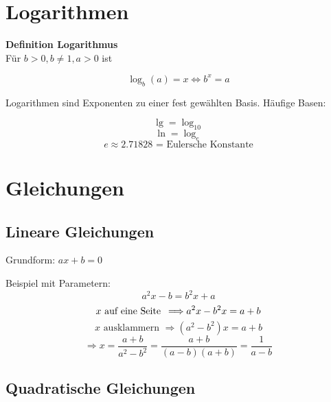 \begin{multicols}{2}
\section*{Logarithmen}
\begin{tcolorbox}[colback=white]
  \textbf{Definition Logarithmus}\\
  Für $b>0, b\ne 1, a>0$ ist

$$\log_b{}(a)=x \Longleftrightarrow{} b^x = a$$
\end{tcolorbox}

Logarithmen sind Exponenten zu einer fest gewählten Basis. Häufige Basen:

$$\lg = \log_{10} $$
$$\ln = \log_e$$
$$e \approx 2.71828 \textrm{ = Eulersche Konstante}$$


\begin{tcolorbox}[colback=white]

\end{tcolorbox}%
%
\forceCB{}%
\headerUndFooterDieseSeite{}

\section*{Gleichungen}

\subsection*{Lineare Gleichungen}
Grundform: $ax+b=0$

Beispiel mit Parametern:
$$a^2x-b=b^2x+a$$
$$x\textrm{ auf eine Seite\, } \Longrightarrow a^2x -b^2x = a+b$$
$$x\textrm{ ausklammern }\Longrightarrow (a^2-b^2)x= a+b$$
$$\Longrightarrow x= \frac{a+b}{a^2-b^2} = \frac{a+b}{(a-b)(a+b)}=\frac{1}{a-b}$$

\subsection*{Quadratische Gleichungen}


\end{multicols}
